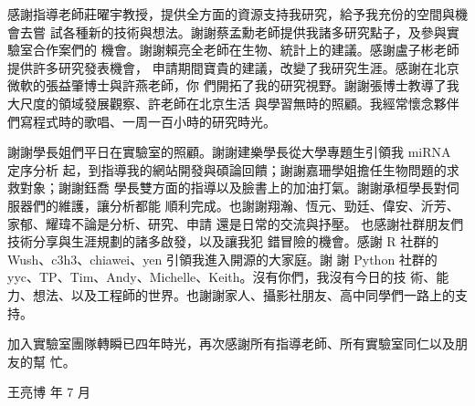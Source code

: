\begin{acknowledgementszh}

感謝指導老師莊曜宇教授，提供全方面的資源支持我研究，給予我充份的空間與機會去嘗
試各種新的技術與想法。謝謝蔡孟勳老師提供我諸多研究點子，及參與實驗室合作案們的
機會。謝謝賴亮全老師在生物、統計上的建議。感謝盧子彬老師提供許多研究發表機會，
申請期間寶貴的建議，改變了我研究生涯。感謝在北京微軟的張益肇博士與許燕老師，你
們開拓了我的研究視野。謝謝張博士教導了我大尺度的領域發展觀察、許老師在北京生活
與學習無時的照顧。我經常懷念夥伴們寫程式時的歌唱、一周一百小時的研究時光。

謝謝學長姐們平日在實驗室的照顧。謝謝建樂學長從大學專題生引領我 miRNA 定序分析
起，到指導我的網站開發與碩論回饋；謝謝嘉珊學姐擔任生物問題的求救對象；謝謝鈺喬
學長雙方面的指導以及臉書上的加油打氣。謝謝承桓學長對伺服器們的維護，讓分析都能
順利完成。也謝謝翔瀚、恆元、勁廷、偉安、沂芳、家郁、耀瑋不論是分析、研究、申請
還是日常的交流與抒壓。 也感謝社群朋友們技術分享與生涯規劃的諸多啟發，以及讓我犯
錯冒險的機會。感謝 R 社群的 Wush、c3h3、chiawei、yen 引領我進入開源的大家庭。謝
謝 Python 社群的 yyc、TP、Tim、Andy、Michelle、Keith。沒有你們，我沒有今日的技
術、能力、想法、以及工程師的世界。也謝謝家人、攝影社朋友、高中同學們一路上的支
持。

加入實驗室團隊轉瞬已四年時光，再次感謝所有指導老師、所有實驗室同仁以及朋友的幫
忙。

\hfill 王亮博 年 7 月
\end{acknowledgementszh}

